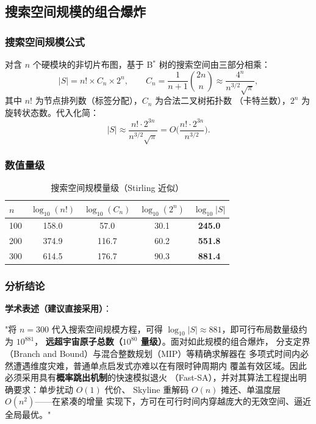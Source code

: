 \documentclass[12pt,a4paper]{article}
\begin{document}
\subsection{搜索空间规模的组合爆炸}

\subsubsection{搜索空间规模公式}

对含 $n$ 个硬模块的非切片布图，基于 B$^*$ 树的搜索空间由三部分相乘：
\begin{equation}
|S| = n! \times C_n \times 2^n,
\qquad
C_n = \frac{1}{n+1}\binom{2n}{n}
     \approx \frac{4^n}{n^{3/2}\sqrt{\pi}},
\end{equation}
其中 $n!$ 为节点排列数（标签分配），$C_n$ 为合法二叉树拓扑数
（卡特兰数），$2^n$ 为旋转状态数。代入化简：
\begin{equation}
|S| \approx \frac{n! \cdot 2^{3n}}{n^{3/2}\sqrt{\pi}}
      = O\!\Big(\frac{n! \cdot 2^{3n}}{n^{3/2}}\Big).
\end{equation}

\subsubsection{数值量级}

\begin{table}[H]
\centering
\scriptsize
\setlength{\tabcolsep}{3pt}
\caption{搜索空间规模量级（Stirling 近似）}
\begin{tabular}{lcccc}
\toprule
$n$ & $\log_{10}(n!)$ & $\log_{10}(C_n)$ & $\log_{10}(2^n)$ & $\log_{10}|S|$ \\
\midrule
100 & 158.0 & 57.0 & 30.1 & \textbf{245.0} \\
200 & 374.9 & 116.7 & 60.2 & \textbf{551.8} \\
300 & 614.5 & 176.7 & 90.3 & \textbf{881.4} \\
\bottomrule
\end{tabular}
\end{table}

\subsubsection{分析结论}

\textbf{学术表述（建议直接采用）}：

"将 $n=300$ 代入搜索空间规模方程，可得
$\log_{10}|S| \approx 881$，即可行布局数量级约为 $10^{881}$，
\textbf{远超宇宙原子总数（$10^{80}$ 量级）}。面对如此规模的组合爆炸，
分支定界（Branch and Bound）与混合整数规划（MIP）等精确求解器在
多项式时间内必然遭遇维度灾难，普通单点启发式亦难以在有限时钟周期内
覆盖有效区域。因此必须采用具有\textbf{概率跳出机制}的快速模拟退火
（Fast-SA），并对其算法工程提出明确要求：单步扰动 $O(1)$ 代价、
Skyline 重解码 $O(n)$ 摊还、单温度层 $O(n^2)$——在紧凑的增量
实现下，方可在可行时间内穿越庞大的无效空间、逼近全局最优。"
\end{document}
